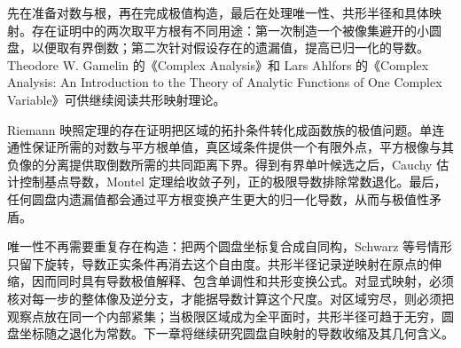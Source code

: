 \ProseParagraphBreak

先在准备对数与根，再在完成极值构造，最后在处理唯一性、共形半径和具体映射。存在证明中的两次取平方根有不同用途：第一次制造一个被像集避开的小圆盘，以便取有界倒数；第二次针对假设存在的遗漏值，提高已归一化的导数。Theodore W. Gamelin 的《Complex Analysis》\cite{Gamelin2001Complex}和 Lars Ahlfors 的《Complex Analysis: An Introduction to the Theory of Analytic Functions of One Complex Variable》\cite{Ahlfors2021Complex}可供继续阅读共形映射理论。





\begin{chaptersummary}
Riemann 映照定理的存在证明把区域的拓扑条件转化成函数族的极值问题。单连通性保证所需的对数与平方根单值，真区域条件提供一个有限外点，平方根像与其负像的分离提供取倒数所需的共同距离下界。得到有界单叶候选之后，Cauchy 估计控制基点导数，Montel 定理给收敛子列，正的极限导数排除常数退化。最后，任何圆盘内遗漏值都会通过平方根变换产生更大的归一化导数，从而与极值性矛盾。

\ProseParagraphBreak

唯一性不再需要重复存在构造：把两个圆盘坐标复合成自同构，Schwarz 等号情形只留下旋转，导数正实条件再消去这个自由度。共形半径记录逆映射在原点的伸缩，因而同时具有导数极值解释、包含单调性和共形变换公式。对显式映射，必须核对每一步的整体像及逆分支，才能据导数计算这个尺度。对区域穷尽，则必须把观察点放在同一个内部紧集；当极限区域成为全平面时，共形半径可趋于无穷，圆盘坐标随之退化为常数。下一章将继续研究圆盘自映射的导数收缩及其几何含义。
\end{chaptersummary}

\BookExercises

